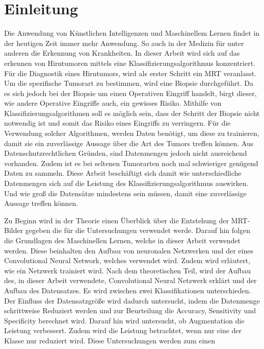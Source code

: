 \chapter{Einleitung}

Die Anwendung von Künstlichen Intelligenzen und Maschinellem Lernen findet in der heutigen Zeit immer mehr Anwendung.
So auch in der Medizin für unter anderen die Erkennung von Krankheiten.
In dieser Arbeit wird sich auf das erkennen von Hirntumoren mittels eine Klassifizierungsalgorithmus konzentriert.
Für die Diagnostik eines Hirntumors, wird als erster Schritt ein MRT veranlasst.
Um die spezifische Tumorart zu bestimmen, wird eine Biopsie durchgeführt.
Da es sich jedoch bei der Biopsie um einen Operativen Eingriff handelt, birgt dieser, wie andere Operative Eingriffe auch, ein gewisses Risiko.
Mithilfe von Klassifizierungsalgorithmen soll es möglich sein, dass der Schritt der Biopsie nicht notwendig ist 
und somit das Risiko eines Eingriffs zu verringern.
Für die Verwendung solcher Algorithmen, werden Daten benötigt, um diese zu trainieren, damit sie ein zuverlässige Aussage über die Art des Tumors treffen können. 
Aus Datenschutzrechtlichen Gründen, sind Datenmengen jedoch nicht ausreichend vorhanden. 
Zudem ist es bei seltenen Tumorarten noch mal schwieriger genügend Daten zu sammeln.
Diese Arbeit beschäftigt sich damit wie unterschiedliche Datenmengen sich auf die Leistung des Klassifizierungsalgorithmus auswirken.
Und wie groß die Datensätze mindestens sein müssen, damit eine zuverlässige Aussage treffen können.

Zu Beginn wird in der Theorie einen Überblick über die Entstehung der MRT-Bilder gegeben die für die Untersuchungen verwendet werde.
Darauf hin folgen die Grundlagen des Maschinellen Lernen, welche in dieser Arbeit verwendet werden.
Diese beinhalten den Aufbau von neuronalen Netzwerken und der eines Convolutional Neural Network, welches verwendet wird.
Zudem wird erläutert, wie ein Netzwerk trainiert wird.
Nach dem theoretischen Teil, wird der Aufbau des, in dieser Arbeit verwendete, Convolutional Neural Netzwerk erklärt und der Aufbau des Datensatzes. 
Es wird zwischen zwei Klassifikationen unterschieden. 
Der Einfluss der Datensatzgröße wird dadurch untersucht, indem die Datenmenge schrittweise Reduziert werden und zur Beurteilung die 
Accuracy, Sensitivity und Specificity berechnet wird. 
Darauf hin wird untersucht, ob Augmentation die Leistung verbessert.
Zudem wird die Leistung betrachtet, wenn nur eine der Klasse nur reduziert wird. 
Diese Untersuchungen werden zum einen 

